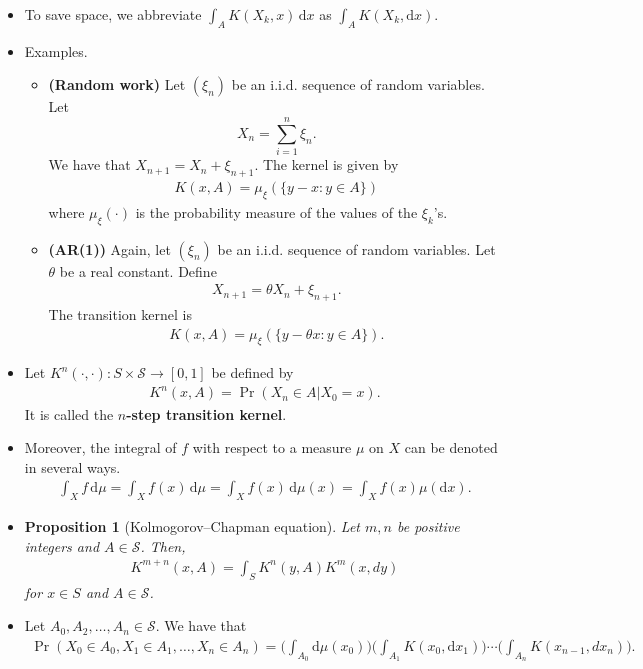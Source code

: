 \documentclass[10pt]{article}
\newtheorem{proposition}[lemma]{Proposition}
\newcommand{\dee}{\mathrm{d}}
\newcommand{\mcal}[1]{\mathcal{#1}}
\begin{document}
\begin{itemize}
  \item To save space, we abbreviate $\int_A K(X_k, x)\, \dee x$ as $\int_A K(X_k, \dee x)$.
  
  \item Examples.
  \begin{itemize}
    \item {\bf (Random work)} Let $(\xi_n)$ be an i.i.d. sequence of random variables. Let $$X_n = \sum_{i=1}^n \xi_n.$$ We have that $X_{n+1} = X_n + \xi_{n+1}$. The kernel is given by
    \begin{align*}
      K(x,A) = \mu_{\xi}(\{ y - x : y \in A \})
    \end{align*}
    where $\mu_{\xi}(\cdot)$ is the probability measure of the values of the $\xi_k$'s.

    \item {\bf (AR(1))} Again, let $(\xi_n)$ be an i.i.d. sequence of random variables. Let $\theta$ be a real constant. Define
    \begin{align*}
      X_{n+1} = \theta X_{n} + \xi_{n+1}.
    \end{align*}
    The transition kernel is
    \begin{align*}
      K(x, A) = \mu_{\xi}(\{ y - \theta x : y \in A \}).
    \end{align*}
  \end{itemize}

  \item Let $K^n(\cdot,\cdot): S \times \mcal{S} \rightarrow [0,1]$ be defined by
  \begin{align*}
    K^n(x, A) = \Pr(X_n \in A | X_0 = x).
  \end{align*}
  It is called the {\bf $n$-step transition kernel}.  

  \item Moreover, the integral of $f$ with respect to a measure $\mu$ on $X$ can be denoted in several ways.
  \begin{align*}
    \int_X f\, \dee\mu
    = \int_X f(x)\, \dee\mu
    = \int_X f(x)\, \dee\mu(x)
    = \int_X f(x)\mu(\dee x).
  \end{align*}  

  \item \begin{proposition}[Kolmogorov--Chapman equation]
    Let $m,n$ be positive integers and $A \in \mcal{S}$. Then,
    \begin{align*}
      K^{m+n}(x, A) = \int_S K^n(y, A) K^m(x, dy)
    \end{align*}
    for $x \in S$ and $A \in \mcal{S}$.
  \end{proposition}

  \item Let $A_0, A_2, \dotsc, A_n \in \mcal{S}$. We have that
  \begin{align*}
    \Pr(X_0 \in A_0, X_1 \in A_1, \dotsc, X_n \in A_n)
    = \bigg( \int_{A_0} \dee\mu(x_0) \bigg) \bigg( \int_{A_1} K(x_0, \dee x_1) \bigg) \dotsb \bigg( \int_{A_n} K(x_{n-1}, dx_n) \bigg).
  \end{align*}
\end{itemize}


  
\end{document}
